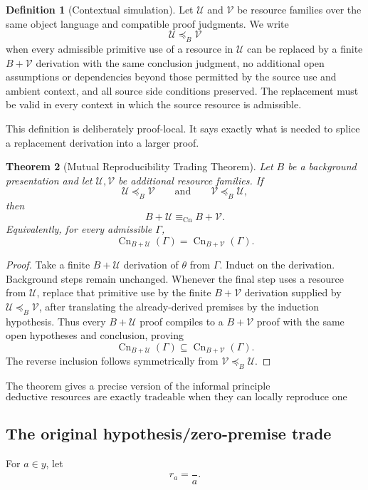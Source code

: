 \documentclass[11pt]{article}
\newtheorem{theorem}{Theorem}[section]
\theoremstyle{definition}
\newtheorem{definition}[theorem]{Definition}
\theoremstyle{remark}
\newcommand{\Cn}{\operatorname{Cn}}
\newcommand{\equivCn}{\equiv_{\mathrm{Cn}}}
\begin{document}
\begin{definition}[Contextual simulation]
Let $\mathcal U$ and $\mathcal V$ be resource families over the same object language and compatible proof judgments. We write
\[
\mathcal U\preceq_B\mathcal V
\]
when every admissible primitive use of a resource in $\mathcal U$ can be replaced by a finite $B+\mathcal V$ derivation with the same conclusion judgment, no additional open assumptions or dependencies beyond those permitted by the source use and ambient context, and all source side conditions preserved. The replacement must be valid in every context in which the source resource is admissible.
\end{definition}

This definition is deliberately proof-local. It says exactly what is needed to splice a replacement derivation into a larger proof.

\begin{theorem}[Mutual Reproducibility Trading Theorem]\label{thm:mutual}
Let $B$ be a background presentation and let $\mathcal U,\mathcal V$ be additional resource families. If
\[
\mathcal U\preceq_B\mathcal V
\qquad\text{and}\qquad
\mathcal V\preceq_B\mathcal U,
\]
then
\[
B+\mathcal U\equivCn B+\mathcal V.
\]
Equivalently, for every admissible $\Gamma$,
\[
\Cn_{B+\mathcal U}(\Gamma)=\Cn_{B+\mathcal V}(\Gamma).
\]
\end{theorem}

\begin{proof}
Take a finite $B+\mathcal U$ derivation of $\theta$ from $\Gamma$. Induct on the derivation. Background steps remain unchanged. Whenever the final step uses a resource from $\mathcal U$, replace that primitive use by the finite $B+\mathcal V$ derivation supplied by $\mathcal U\preceq_B\mathcal V$, after translating the already-derived premises by the induction hypothesis. Thus every $B+\mathcal U$ proof compiles to a $B+\mathcal V$ proof with the same open hypotheses and conclusion, proving
\[
\Cn_{B+\mathcal U}(\Gamma)\subseteq\Cn_{B+\mathcal V}(\Gamma).
\]
The reverse inclusion follows symmetrically from $\mathcal V\preceq_B\mathcal U$.
\end{proof}

The theorem gives a precise version of the informal principle
\[
\boxed{\text{deductive resources are exactly tradeable when they can locally reproduce one another.}}
\]

\subsection{The original hypothesis/zero-premise trade}
For $a\in y$, let
\[
r_a=\frac{}{a}.
\]
\end{document}
